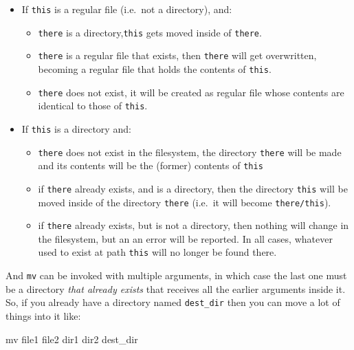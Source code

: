 \documentclass[]{krantz}
\makeatletter
\newenvironment{Shaded}{\begin{snugshade}}{\end{snugshade}}
\newcommand{\FunctionTok}[1]{\textcolor[rgb]{0,0,0}{#1}}
\newcommand{\NormalTok}[1]{#1}
\providecommand{\tightlist}{%
  \setlength{\itemsep}{0pt}\setlength{\parskip}{0pt}}
\newenvironment{kframe}{%
\medskip{}
\setlength{\fboxsep}{.8em}
 \def\at@end@of@kframe{}%
 \ifinner\ifhmode%
  \def\at@end@of@kframe{\end{minipage}}%
  \begin{minipage}{\columnwidth}%
 \fi\fi%
 \def\FrameCommand##1{\hskip\@totalleftmargin \hskip-\fboxsep
 \colorbox{shadecolor}{##1}\hskip-\fboxsep
     \hskip-\linewidth \hskip-\@totalleftmargin \hskip\columnwidth}%
 \MakeFramed {\advance\hsize-\width
   \@totalleftmargin\z@ \linewidth\hsize
   \@setminipage}}%
 {\par\unskip\endMakeFramed%
 \at@end@of@kframe}
\renewenvironment{Shaded}{\begin{kframe}}{\end{kframe}}
\makeatother
\begin{document}
\begin{itemize}
\tightlist
\item
  If \texttt{this} is a regular file (i.e.~not a directory), and:

  \begin{itemize}
  \tightlist
  \item
    \texttt{there} is a directory,\texttt{this} gets moved inside of \texttt{there}.
  \item
    \texttt{there} is a regular file that exists, then \texttt{there} will get overwritten, becoming a regular
    file that holds the contents of \texttt{this}.
  \item
    \texttt{there} does not exist, it will be created as regular file whose contents are identical
    to those of \texttt{this}.
  \end{itemize}
\item
  If \texttt{this} is a
  directory and:

  \begin{itemize}
  \tightlist
  \item
    \texttt{there} does not exist in the filesystem, the directory \texttt{there} will be made
    and its contents will be the (former) contents of \texttt{this}
  \item
    if \texttt{there} already exists, and is a directory, then the directory \texttt{this} will
    be moved inside of the directory \texttt{there} (i.e.~it will become \texttt{there/this}).
  \item
    if \texttt{there} already exists, but is not a directory, then nothing will change
    in the filesystem, but an an error will
    be reported.
    In all cases, whatever used to exist at path \texttt{this} will no longer be found there.
  \end{itemize}
\end{itemize}

And \texttt{mv} can be invoked with multiple arguments, in which case the last one must be a directory
\emph{that already exists} that receives all the earlier arguments inside it. So, if you already have
a directory named \texttt{dest\_dir} then you can move a lot of things into it like:

\begin{Shaded}
\begin{Highlighting}[]
\FunctionTok{mv}\NormalTok{ file1 file2 dir1 dir2 dest_dir}
\end{Highlighting}
\end{Shaded}
\end{document}
